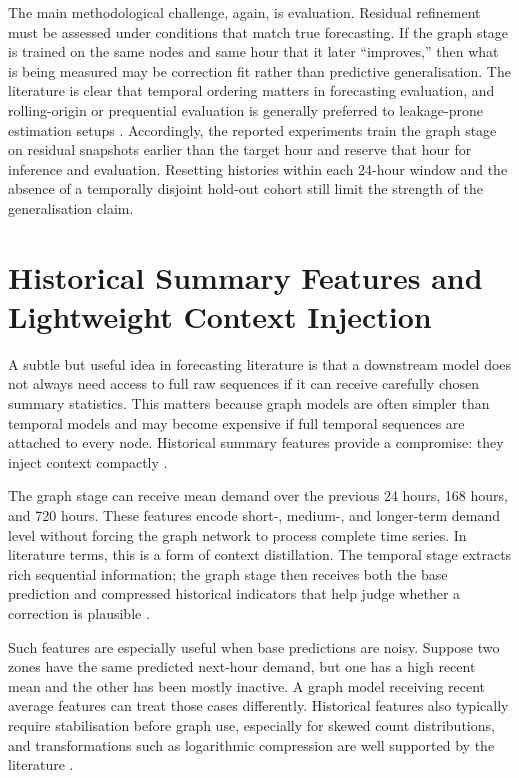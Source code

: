 \documentclass[12pt,a4paper]{report}
\begin{document}
The main methodological challenge, again, is evaluation. Residual refinement must be assessed under conditions that match true forecasting. If the graph stage is trained on the same nodes and same hour that it later ``improves,'' then what is being measured may be correction fit rather than predictive generalisation. The literature is clear that temporal ordering matters in forecasting evaluation, and rolling-origin or prequential evaluation is generally preferred to leakage-prone estimation setups \cite{hewamalage2022pitfalls,cerqueira2020evaluating}. Accordingly, the reported experiments train the graph stage on residual snapshots earlier than the target hour and reserve that hour for inference and evaluation. Resetting histories within each 24-hour window and the absence of a temporally disjoint hold-out cohort still limit the strength of the generalisation claim.

\section{Historical Summary Features and Lightweight Context Injection}

A subtle but useful idea in forecasting literature is that a downstream model does not always need access to full raw sequences if it can receive carefully chosen summary statistics. This matters because graph models are often simpler than temporal models and may become expensive if full temporal sequences are attached to every node. Historical summary features provide a compromise: they inject context compactly \cite{jiang2022survey,lim2021survey}.

The graph stage can receive mean demand over the previous 24 hours, 168 hours, and 720 hours. These features encode short-, medium-, and longer-term demand level without forcing the graph network to process complete time series. In literature terms, this is a form of context distillation. The temporal stage extracts rich sequential information; the graph stage then receives both the base prediction and compressed historical indicators that help judge whether a correction is plausible \cite{lyu2021bigdata,demandfeatures2023}.

Such features are especially useful when base predictions are noisy. Suppose two zones have the same predicted next-hour demand, but one has a high recent mean and the other has been mostly inactive. A graph model receiving recent average features can treat those cases differently. Historical features also typically require stabilisation before graph use, especially for skewed count distributions, and transformations such as logarithmic compression are well supported by the literature \cite{akram2023counts,lyu2021bigdata}.
\end{document}
